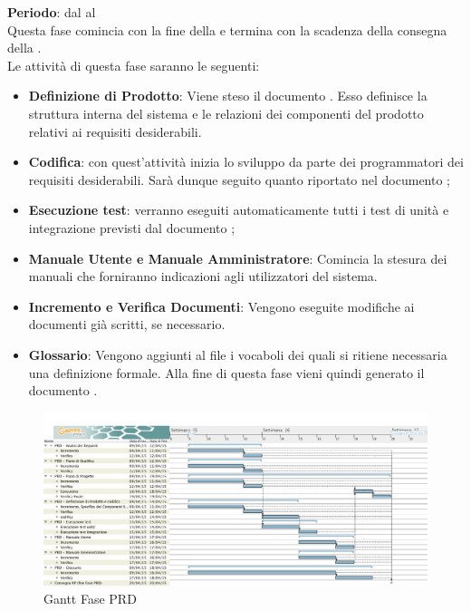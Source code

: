 	\textbf{Periodo}: dal  al  \\Questa fase comincia con la fine della  e termina con la scadenza della consegna della .\\Le attività di questa fase saranno le seguenti:
	\begin{itemize}
		\item\textbf{Definizione di Prodotto}: Viene steso il documento . Esso definisce la struttura interna del sistema e le relazioni dei componenti del prodotto relativi ai requisiti desiderabili.
		\item \textbf{Codifica}: con quest'attività inizia lo sviluppo da parte dei programmatori dei requisiti desiderabili. Sarà dunque seguito quanto riportato nel documento ;
		\item \textbf{Esecuzione test}: verranno eseguiti automaticamente tutti i test di unità e integrazione previsti dal documento ;
		\item\textbf{Manuale Utente e Manuale Amministratore}: Comincia la stesura dei manuali che forniranno indicazioni agli utilizzatori del sistema.
		\item\textbf{Incremento e Verifica Documenti}: Vengono eseguite modifiche ai documenti già scritti, se necessario.
		\item\textbf{Glossario}: Vengono aggiunti al file  i vocaboli dei quali si ritiene necessaria una definizione formale. Alla fine di questa fase vieni quindi generato il documento .
	\end{itemize}
	\begin{figure}[H]\centering
		\includegraphics[width=\textwidth]{PianoDiProgetto/Pics/FasePRD.png}
	\caption{Gantt Fase PRD}
\end{figure}
